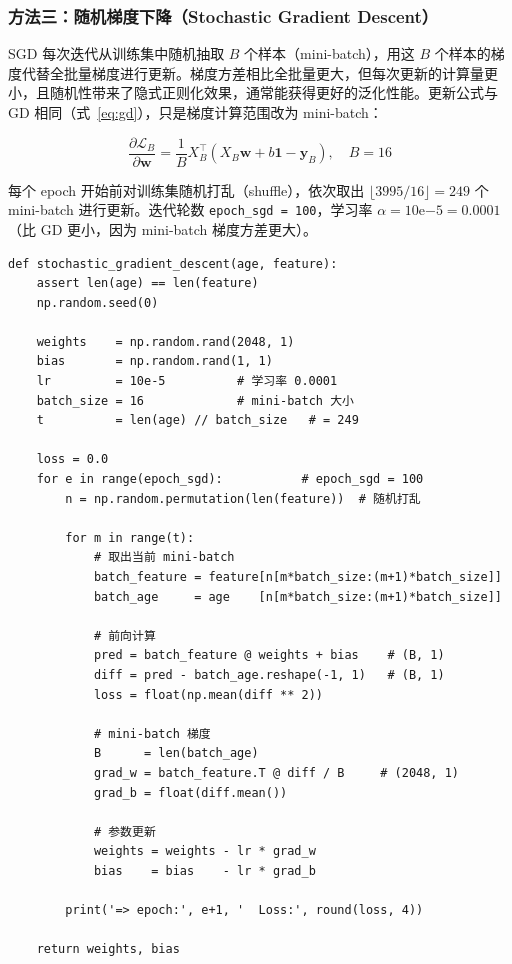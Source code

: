 \documentclass[12pt,a4paper]{ctexart}
\begin{document}
\subsubsection{方法三：随机梯度下降（Stochastic Gradient Descent）}

SGD 每次迭代从训练集中随机抽取 $B$ 个样本（mini-batch），用这 $B$ 个样本的梯度代替全批量梯度进行更新。梯度方差相比全批量更大，但每次更新的计算量更小，且随机性带来了隐式正则化效果，通常能获得更好的泛化性能。更新公式与 GD 相同（式~\eqref{eq:gd}），只是梯度计算范围改为 mini-batch：

\begin{equation}
  \frac{\partial \mathcal{L}_B}{\partial \mathbf{w}} = \frac{1}{B} X_B^\top (X_B \mathbf{w} + b\mathbf{1} - \mathbf{y}_B), \quad B = 16
\end{equation}

每个 epoch 开始前对训练集随机打乱（shuffle），依次取出 $\lfloor 3995/16 \rfloor = 249$ 个 mini-batch 进行更新。迭代轮数 \texttt{epoch\_sgd = 100}，学习率 $\alpha = 10\mathrm{e}{-5} = 0.0001$（比 GD 更小，因为 mini-batch 梯度方差更大）。

\begin{lstlisting}
def stochastic_gradient_descent(age, feature):
    assert len(age) == len(feature)
    np.random.seed(0)

    weights    = np.random.rand(2048, 1)
    bias       = np.random.rand(1, 1)
    lr         = 10e-5          # 学习率 0.0001
    batch_size = 16             # mini-batch 大小
    t          = len(age) // batch_size   # = 249

    loss = 0.0
    for e in range(epoch_sgd):           # epoch_sgd = 100
        n = np.random.permutation(len(feature))  # 随机打乱

        for m in range(t):
            # 取出当前 mini-batch
            batch_feature = feature[n[m*batch_size:(m+1)*batch_size]]
            batch_age     = age    [n[m*batch_size:(m+1)*batch_size]]

            # 前向计算
            pred = batch_feature @ weights + bias    # (B, 1)
            diff = pred - batch_age.reshape(-1, 1)   # (B, 1)
            loss = float(np.mean(diff ** 2))

            # mini-batch 梯度
            B      = len(batch_age)
            grad_w = batch_feature.T @ diff / B     # (2048, 1)
            grad_b = float(diff.mean())

            # 参数更新
            weights = weights - lr * grad_w
            bias    = bias    - lr * grad_b

        print('=> epoch:', e+1, '  Loss:', round(loss, 4))

    return weights, bias
\end{lstlisting}
\end{document}
